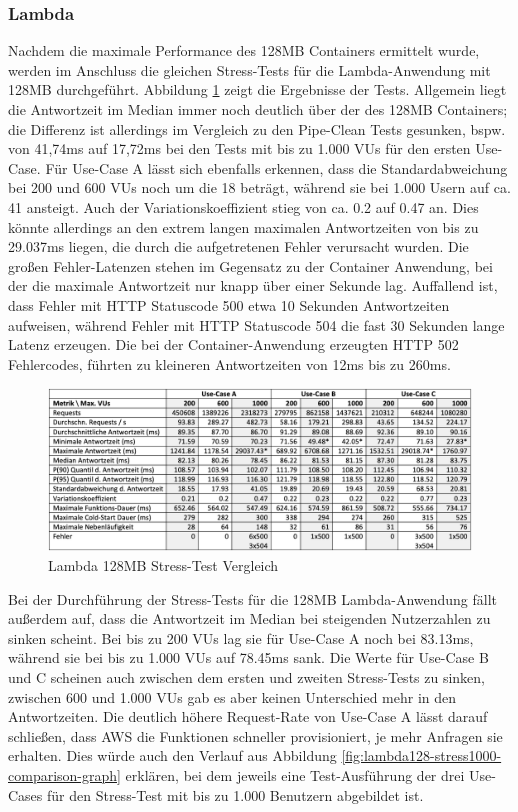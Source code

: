 \subsubsection{Lambda}
Nachdem die maximale Performance des 128MB Containers ermittelt wurde, werden im Anschluss die gleichen Stress-Tests für die Lambda-Anwendung mit 128MB durchgeführt. Abbildung \ref{fig:lambda128-stress-comparison} zeigt die Ergebnisse der Tests. 
Allgemein liegt die Antwortzeit im Median immer noch deutlich über der des 128MB Containers; die Differenz ist allerdings im Vergleich zu den Pipe-Clean Tests gesunken, bspw. von 41,74ms auf 17,72ms bei den Tests mit bis zu 1.000 \acp{VU} für den ersten Use-Case.
Für Use-Case A lässt sich ebenfalls erkennen, dass die Standardabweichung bei 200 und 600 \acp{VU} noch um die 18 beträgt, während sie bei 1.000 Usern auf ca. 41 ansteigt. Auch der Variationskoeffizient stieg von ca. 0.2 auf 0.47 an. Dies könnte allerdings an den extrem langen maximalen Antwortzeiten von bis zu 29.037ms liegen, die durch die aufgetretenen Fehler verursacht wurden. Die großen Fehler-Latenzen stehen im Gegensatz zu der Container Anwendung, bei der die maximale Antwortzeit nur knapp über einer Sekunde lag. Auffallend ist, dass Fehler mit HTTP Statuscode 500 etwa 10 Sekunden Antwortzeiten aufweisen, während Fehler mit HTTP Statuscode 504 die fast 30 Sekunden lange Latenz erzeugen. Die bei der Container-Anwendung erzeugten HTTP 502 Fehlercodes, führten zu kleineren Antwortzeiten von 12ms bis zu 260ms. 

\begin{figure}[H]
    \includegraphics[width=\textwidth]{img/lambda128-stress-comparison.png}
    \caption[Lambda 128MB Stress-Test Vergleich]{Lambda 128MB Stress-Test Vergleich}
    \label{fig:lambda128-stress-comparison}
\end{figure}

Bei der Durchführung der Stress-Tests für die 128MB Lambda-Anwendung fällt außerdem auf, dass die Antwortzeit im Median bei steigenden Nutzerzahlen zu sinken scheint. Bei bis zu 200 \acp{VU} lag sie für Use-Case A noch bei 83.13ms, während sie bei bis zu 1.000 \acp{VU} auf 78.45ms sank. Die Werte für Use-Case B und C scheinen auch zwischen dem ersten und zweiten Stress-Tests zu sinken, zwischen 600 und 1.000 \acp{VU} gab es aber keinen Unterschied mehr in den Antwortzeiten. Die deutlich höhere Request-Rate von Use-Case A lässt darauf schließen, dass \ac{AWS} die Funktionen schneller provisioniert, je mehr Anfragen sie erhalten.
Dies würde auch den Verlauf aus Abbildung \ref{fig:lambda128-stress1000-comparison-graph} erklären, bei dem jeweils eine Test-Ausführung der drei Use-Cases für den Stress-Test mit bis zu 1.000 Benutzern abgebildet ist.

